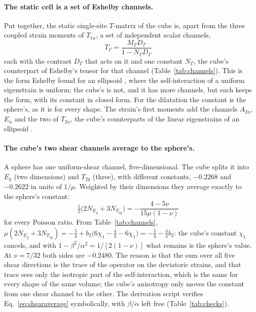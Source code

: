 \documentclass[11pt,a4paper]{article}
\begin{document}
\paragraph{The static cell is a set of Eshelby channels.} Put together, the static single-site
$T$-matrix of the cube is, apart from the three coupled strain moments of $T_{1u}$, a set of independent
scalar channels,
\begin{equation}\label{eq:eshelbychannels}
  \boxed{\;T_\Gamma=\frac{M_\Gamma D_\Gamma}{1-N_\Gamma D_\Gamma}\;}
\end{equation}
each with the contrast $D_\Gamma$ that acts on it and one constant $N_\Gamma$, the cube's counterpart of
Eshelby's tensor for that channel (Table~\ref{tab:channels}). This is the form Eshelby found for an
ellipsoid \citep{Eshelby1957}, where the self-interaction of a uniform eigenstrain is uniform; the cube's
is not, and it has more channels, but each keeps the form, with its constant in closed form. For the
dilatation the constant is the sphere's, as it is for every shape. The strain's first moments add the
channels $A_{2u}$, $E_u$ and the two of $T_{2u}$, the cube's counterparts of the linear eigenstrains of an
ellipsoid \citep{Mura1987}.

\paragraph{The cube's two shear channels average to the sphere's.} A sphere has one uniform-shear channel,
five-dimensional. The cube splits it into $E_g$ (two dimensions) and $T_{2g}$ (three), with different
constants, $-0.2268$ and $-0.2622$ in units of $1/\mu$. Weighted by their dimensions they average exactly to
the sphere's constant:
\begin{equation}\label{eq:shearaverage}
  \boxed{\;\tfrac15\bigl(2N_{E_g}+3N_{T_{2g}}\bigr)=-\frac{4-5\nu}{15\mu(1-\nu)}\;}
\end{equation}
for every Poisson ratio. From Table~\ref{tab:channels},
$\mu(2N_{E_g}+3N_{T_{2g}})=-\tfrac53+b_2\bigl(6\chi_1-\tfrac43-6\chi_1\bigr)=-\tfrac53-\tfrac43b_2$: the cube's
constant $\chi_1$ cancels, and with $1-\beta^2/\alpha^2=1/[2(1-\nu)]$ what remains is the sphere's value. At
$\nu=7/32$ both sides are $-0.2480$. The reason is that the sum over all five shear directions is the
trace of the operator on the deviatoric strains, and that trace sees only the isotropic part of the
self-interaction, which is the same for every shape of the same volume; the cube's anisotropy only moves
the constant from one shear channel to the other. The derivation script verifies
Eq.~\eqref{eq:shearaverage} symbolically, with $\beta/\alpha$ left free (Table~\ref{tab:checks}).
\end{document}

